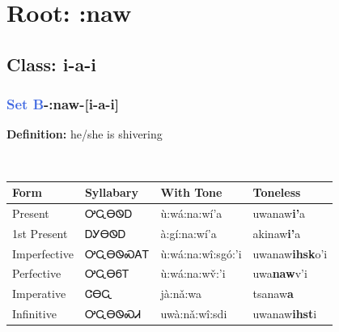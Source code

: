 \needspace{4in}
\section*{Root: :naw}
\nopagebreak
{}
\needspace{3in}
\subsection*{Class: i-a-i}
\nopagebreak
\needspace{2in}
\subsubsection*{\textcolor{RoyalBlue}{Set B}{-}\textbf{:naw}{-}[i-a-i]}
\nopagebreak
\textbf{Definition: } he/she is shivering
\\[0.5em]
\begin{tabularx}{\textwidth}{l X X X}%
\toprule%
\textbf{Form}&\textbf{Syllabary}&\textbf{With Tone}&\textbf{Toneless}\\%
\midrule%
Present&ᎤᏩᎾᏫᎠ&ù:wá:na:wí’a&uwanaw\textbf{i'}a\\%
1st Present&ᎠᎩᎾᏫᎠ&à:gí:na:wí’a&akinaw\textbf{i'}a\\%
Imperfective&ᎤᏩᎾᏫᏍᎪᎢ&ù:wá:na:wî:sgó:’i&uwanaw\textbf{ihsk}o'i\\%
Perfective&ᎤᏩᎾᏮᎢ&ù:wá:na:wv̌:’i&uwa\textbf{naw}v'i\\%
Imperative&ᏣᎾᏩ&jà:nǎ:wa&tsanaw\textbf{a}\\%
Infinitive&ᎤᏩᎾᏫᏍᏗ&uwà:nǎ:wî:sdi&uwanaw\textbf{ihst}i\\%
\bottomrule%
\end{tabularx}
\\[1em]